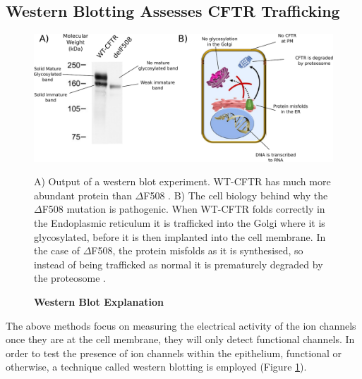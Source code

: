 \subsection{Western Blotting Assesses CFTR Trafficking}
\begin{figure}
	\label{western_blot}
	\begin{center}
	\includegraphics[width=1\textwidth]{figures/western_blot_explanation.pdf}
	\end{center}
	\captionsetup{singlelinecheck = false, justification=raggedright}
	\caption[Western Blot Explanation] {\textbf{Western Blot Explanation}}{A) Output of a western blot experiment. WT-CFTR has much more abundant protein than $\Delta$F508 \cite{chang2008}. B) The cell biology behind why the $\Delta$F508 mutation is pathogenic. When WT-CFTR folds correctly in the Endoplasmic reticulum it is trafficked into the Golgi where it is glycosylated, before it is then implanted into the cell membrane. In the case of $\Delta$F508, the protein misfolds as it is synthesised, so instead of being trafficked as normal it is prematurely degraded by the proteosome \cite{lopes-pacheco2016a, lewis2005}.} 
\end{figure}
The above methods focus on measuring the electrical activity of the ion channels once they are at the cell membrane, they will only detect functional channels. In order to test the presence of ion channels within the epithelium, functional or otherwise, a technique called western blotting is employed (Figure \ref{western_blot}).

